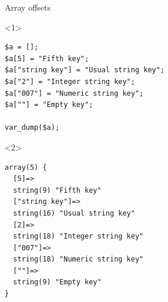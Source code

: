 \documentclass[aspectratio=169]{beamer}
\begin{document}
\begin{frame}[fragile]{Array offsets}
    \begin{onlyenv}<1>
        \begin{verbatim}
$a = [];
$a[5] = "Fifth key";
$a["string key"] = "Usual string key";
$a["2"] = "Integer string key";
$a["007"] = "Numeric string key";
$a[""] = "Empty key";

var_dump($a);
        \end{verbatim}
    \end{onlyenv}
    \begin{onlyenv}<2>
        \begin{verbatim}
array(5) {
  [5]=>
  string(9) "Fifth key"
  ["string key"]=>
  string(16) "Usual string key"
  [2]=>
  string(18) "Integer string key"
  ["007"]=>
  string(18) "Numeric string key"
  [""]=>
  string(9) "Empty key"
}
        \end{verbatim}
    \end{onlyenv}
\end{frame}
\end{document}
